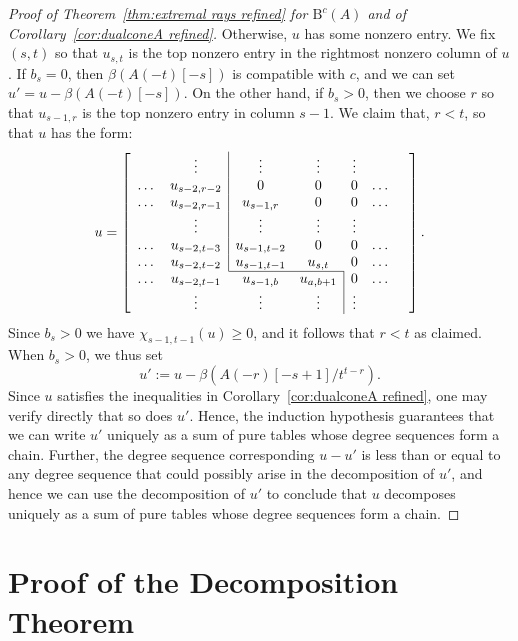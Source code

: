 \documentclass[12pt]{amsart}
\theoremstyle{definition}
\theoremstyle{remark}
\newcommand{\cc}{c}
\newcommand{\BBQ}{\mathrm{B}}
\begin{document}
\begin{proof}[Proof of Theorem~\ref{thm:extremal rays refined} for $\BBQ^{\cc}(A)$ and of Corollary~\ref{cor:dualconeA refined}]
Otherwise, $u$ has some nonzero entry.  We fix $(s,t)$ so that $u_{s,t}$ is the top nonzero entry in the rightmost nonzero column of $u$.
If $b_s=0$, then $\beta(A(-t)[-s])$ is compatible with $\cc$, and we can set $u'=u-\beta(A(-t)[-s])$.  On the other hand, if $b_s>0$, then we choose $r$ so that $u_{s-1,r}$ is the top nonzero entry in column $s-1$.  We claim that, $r<t$, so that $u$ has the form:
\[
u=
\left[
\begin{array}{ccccccc}
 & \vdots& \multicolumn{1}{|c}{\vdots}&\vdots& \vdots&&\\
\dots&u_{s-2,r-2}&\multicolumn{1}{|c}{0}&0&0&\dots\\
\dots&u_{s-2,r-1}&\multicolumn{1}{|c}{u_{s-1,r}}&0&0&\dots\\
 & \vdots& \multicolumn{1}{|c}{\vdots}&\vdots& \vdots&&\\
\dots&u_{s-2,t-3}&\multicolumn{1}{|c}{u_{s-1,t-2}}&0&0&\dots\\
\dots&u_{s-2,t-2}&\multicolumn{1}{|c}{u_{s-1,t-1}}&u_{s,t}&0&\dots\\ \cline{3-4}
\dots&u_{s-2,t-1}&u_{s-1,b}&u_{a,b+1}&\multicolumn{1}{|c}{0}&\dots\\
& \vdots&\vdots&\vdots& \multicolumn{1}{|c}{\vdots}&&\\
\end{array}\right].
\]
Since $b_s>0$ we have $\chi_{s-1,t-1}(u)\geq 0$, and it follows that $r<t$ as claimed.  When $b_s>0$, we thus set
\[
u':=u-\beta(A(-r)[-s+1]/t^{t-r}).
\]
Since $u$ satisfies the inequalities in Corollary~\ref{cor:dualconeA refined}, one may verify directly that so does $u'$.  Hence, the induction hypothesis guarantees that we can write $u'$ uniquely as a sum of pure tables whose degree sequences form a chain.  Further, the degree sequence corresponding $u-u'$ is less than or equal to any degree sequence that could possibly arise in the decomposition of $u'$, and hence we can use the decomposition of $u'$ to conclude that $u$ decomposes uniquely as a sum of pure tables whose degree sequences form a chain.
\end{proof}




\section{Proof of the Decomposition Theorem}\label{sec:refined proof}\label{sec:general case}
\end{document}
